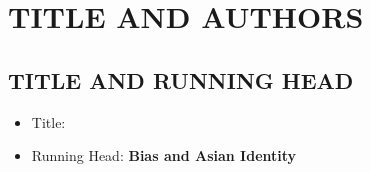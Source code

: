 \documentclass[12pt,english]{article}
\begin{document}



\setcounter{page}{1}

\section*{TITLE AND AUTHORS}
\subsection*{TITLE AND RUNNING HEAD}
\begin{itemize}[label={}, leftmargin=*]
    \item Title: \textbf{\PAPERTITLE}
    \item Running Head:  \textbf{Bias and Asian Identity}
\end{itemize}
\end{document}

